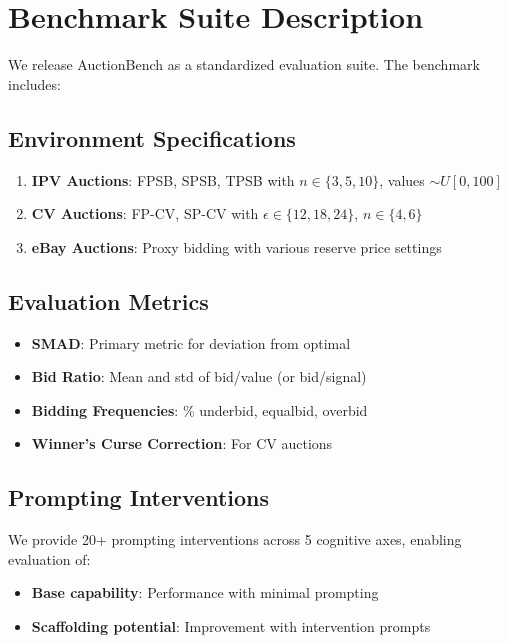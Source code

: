 \documentclass[12pt]{article}
\begin{document}
\section{Benchmark Suite Description}

We release AuctionBench as a standardized evaluation suite. The benchmark includes:

\subsection{Environment Specifications}

\begin{enumerate}
    \item \textbf{IPV Auctions}: FPSB, SPSB, TPSB with $n \in \{3, 5, 10\}$, values $\sim U[0, 100]$
    \item \textbf{CV Auctions}: FP-CV, SP-CV with $\epsilon \in \{12, 18, 24\}$, $n \in \{4, 6\}$
    \item \textbf{eBay Auctions}: Proxy bidding with various reserve price settings
\end{enumerate}

\subsection{Evaluation Metrics}

\begin{itemize}
    \item \textbf{SMAD}: Primary metric for deviation from optimal
    \item \textbf{Bid Ratio}: Mean and std of bid/value (or bid/signal)
    \item \textbf{Bidding Frequencies}: \% underbid, equalbid, overbid
    \item \textbf{Winner's Curse Correction}: For CV auctions
\end{itemize}

\subsection{Prompting Interventions}

We provide 20+ prompting interventions across 5 cognitive axes, enabling evaluation of:
\begin{itemize}
    \item \textbf{Base capability}: Performance with minimal prompting
    \item \textbf{Scaffolding potential}: Improvement with intervention prompts
\end{itemize}
\end{document}
